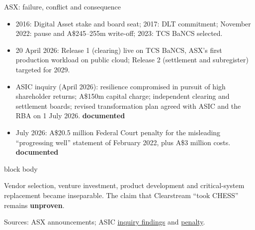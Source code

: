 \documentclass[aspectratio=169,12pt]{beamer}
\newcommand{\source}[1]{\vfill\par\fontsize{5.4}{6.5}\selectfont\color{Quiet}Sources: #1}
\newcommand{\tightitems}{\setlength{\itemsep}{0.42em}\setlength{\parskip}{0pt}}
\newcommand{\tdoc}{\textcolor{Sage}{\bfseries documented}}
\newcommand{\tunp}{\textcolor{Quiet}{\bfseries unproven}}
\newenvironment{statement}{%
  \begin{beamercolorbox}[sep=.18cm,rounded=false,wd=\linewidth]{block body}%
  \fontsize{13}{15.5}\selectfont\bfseries
}{\end{beamercolorbox}}
\begin{document}
\begin{frame}[shrink=12]{ASX: failure, conflict and consequence}
  \begin{itemize}\tightitems
    \item 2016: Digital Asset stake and board seat; 2017: DLT commitment; November 2022: pause and A\$245--255m write-off; 2023: TCS BaNCS selected.
    \item 20 April 2026: Release 1 (clearing) live on TCS BaNCS, ASX's first production workload on public cloud; Release 2 (settlement and subregister) targeted for 2029.
    \item ASIC inquiry (April 2026): resilience compromised in pursuit of high shareholder returns; A\$150m capital charge; independent clearing and settlement boards; revised transformation plan agreed with ASIC and the RBA on 1 July 2026. \tdoc
    \item July 2026: A\$20.5 million Federal Court penalty for the misleading ``progressing well'' statement of February 2022, plus A\$3 million costs. \tdoc
  \end{itemize}
  \begin{statement}
    Vendor selection, venture investment, product development and critical-system replacement became inseparable. The claim that Clearstream ``took CHESS'' remains \tunp.
  \end{statement}
  \source{ASX announcements; ASIC \href{https://www.asic.gov.au/about-asic/news-centre/find-a-media-release/2026-releases/26-059mr-asic-publishes-asx-inquiry-panel-final-report-and-acknowledges-observations/}{inquiry findings} and \href{https://www.asic.gov.au/about-asic/news-centre/find-a-media-release/2026-releases/26-143mr-asx-ordered-to-pay-20-5-million-penalty-for-misleading-conduct-relating-to-chess-replacement-project/}{penalty}.}
\end{frame}
\end{document}
